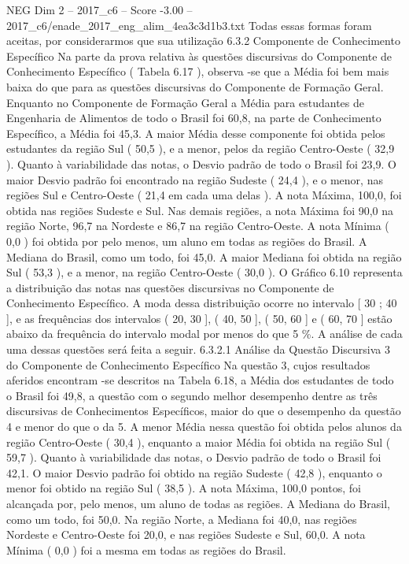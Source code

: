 \begin{textsample}{NEG Dim 2 – 2017\_c6 – Score -3.00 – 2017\_c6/enade\_2017\_eng\_alim\_4ea3c3d1b3.txt}
Todas essas formas foram aceitas, por considerarmos que sua utilização 6.3.2 Componente de Conhecimento Específico Na parte da prova relativa às questões discursivas do Componente de Conhecimento Específico ( Tabela 6.17 ), observa -se que a Média foi bem mais baixa do que para as questões discursivas do Componente de Formação Geral.
Enquanto no Componente de Formação Geral a Média para estudantes de Engenharia de Alimentos de todo o Brasil foi 60,8, na parte de Conhecimento Específico, a Média foi 45,3.
A maior Média desse componente foi obtida pelos estudantes da região Sul ( 50,5 ), e a menor, pelos da região Centro-Oeste ( 32,9 ).
Quanto à variabilidade das notas, o Desvio padrão de todo o Brasil foi 23,9.
O maior Desvio padrão foi encontrado na região Sudeste ( 24,4 ), e o menor, nas regiões Sul e Centro-Oeste ( 21,4 em cada uma delas ).
A nota Máxima, 100,0, foi obtida nas regiões Sudeste e Sul.
Nas demais regiões, a nota Máxima foi 90,0 na região Norte, 96,7 na Nordeste e 86,7 na região Centro-Oeste.
A nota Mínima ( 0,0 ) foi obtida por pelo menos, um aluno em todas as regiões do Brasil.
A Mediana do Brasil, como um todo, foi 45,0.
A maior Mediana foi obtida na região Sul ( 53,3 ), e a menor, na região Centro-Oeste ( 30,0 ).
O Gráfico 6.10 representa a distribuição das notas nas questões discursivas no Componente de Conhecimento Específico.
A moda dessa distribuição ocorre no intervalo [ 30 ; 40 ], e as frequências dos intervalos ( 20, 30 ], ( 40, 50 ], ( 50, 60 ] e ( 60, 70 ] estão abaixo da frequência do intervalo modal por menos do que 5 \%.
A análise de cada uma dessas questões será feita a seguir. 6.3.2.1 Análise da Questão Discursiva 3 do Componente de Conhecimento Específico Na questão 3, cujos resultados aferidos encontram -se descritos na Tabela 6.18, a Média dos estudantes de todo o Brasil foi 49,8, a questão com o segundo melhor desempenho dentre as três discursivas de Conhecimentos Específicos, maior do que o desempenho da questão 4 e menor do que o da 5.
A menor Média nessa questão foi obtida pelos alunos da região Centro-Oeste ( 30,4 ), enquanto a maior Média foi obtida na região Sul ( 59,7 ).
Quanto à variabilidade das notas, o Desvio padrão de todo o Brasil foi 42,1.
O maior Desvio padrão foi obtido na região Sudeste ( 42,8 ), enquanto o menor foi obtido na região Sul ( 38,5 ).
A nota Máxima, 100,0 pontos, foi alcançada por, pelo menos, um aluno de todas as regiões.
A Mediana do Brasil, como um todo, foi 50,0.
Na região Norte, a Mediana foi 40,0, nas regiões Nordeste e Centro-Oeste foi 20,0, e nas regiões Sudeste e Sul, 60,0.
A nota Mínima ( 0,0 ) foi a mesma em todas as regiões do Brasil.

\end{textsample}
